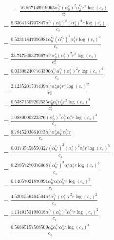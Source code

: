 \documentclass[10pt]{article}
\begin{document}
\begin{align*}
\phantom{R_{0,8}} &\phantom{={}}{}  - \frac{16.567149919063 \alpha_{0}^{c_s} \left(\alpha_{0}^s\right)^{2} \alpha_{2}^{c_s} r^{2} \log{\left(c_{s} \right)}}{c_{s}^{2}} \\
&{}  - \frac{8.3364134707847 \alpha_{0}^{c_s} \left(\alpha_{0}^s\right)^{2} \left(\alpha_{1}^s\right)^{2} r \log{\left(c_{s} \right)}}{c_{s}} \\
&{}  - \frac{0.52311847096981 \alpha_{0}^{c_s} \left(\alpha_{1}^{c_s}\right)^{2} \alpha_{1}^s r \log{\left(c_{s} \right)}^{2}}{c_{s}} \\
&{}  - \frac{33.747569327667 \alpha_{0}^{c_s} \alpha_{0}^s \left(\alpha_{1}^s\right)^{2} r^{2} \log{\left(c_{s} \right)}}{c_{s}^{2}} \\
&{}  - \frac{0.033082407763396 \alpha_{0}^{c_s} \alpha_{1}^{c_s} \left(\alpha_{1}^s\right)^{2} r \log{\left(c_{s} \right)}^{4}}{c_{s}} \\
&{}  - \frac{2.1235201537439 \alpha_{0}^{c_s} \alpha_{0}^s \alpha_{1}^s r^{4} \log{\left(c_{s} \right)}^{2}}{c_{s}^{4}} \\
&{}  - \frac{0.53871509262535 \alpha_{0}^s \alpha_{1}^s \alpha_{2}^s r^{2} \log{\left(c_{s} \right)}^{4}}{c_{s}^{2}} \\
&{}  - \frac{1.0880000223376 \left(\alpha_{0}^s\right)^{3} \alpha_{1}^{c_s} \alpha_{1}^s r \log{\left(c_{s} \right)}^{3}}{c_{s}} \\
&{}  - \frac{8.7845203661073 \alpha_{0}^{c_s} \alpha_{0}^s \alpha_{1}^{c_s} \alpha_{2}^{c_s} r}{c_{s}} \\
&{}  - \frac{0.01735458550327 \left(\alpha_{0}^{c_s}\right)^{2} \left(\alpha_{0}^s\right)^{2} \alpha_{2}^s r \log{\left(c_{s} \right)}^{5}}{c_{s}} \\
&{}  - \frac{0.27857270376068 \left(\alpha_{0}^{c_s}\right)^{3} \alpha_{0}^s \alpha_{2}^s r \log{\left(c_{s} \right)}^{3}}{c_{s}} \\
&{}  - \frac{0.14057021870991 \alpha_{0}^{c_s} \alpha_{1}^s \alpha_{3}^{c_s} r \log{\left(c_{s} \right)}^{2}}{c_{s}} \\
&{}  - \frac{4.5201556464504 \alpha_{0}^s \alpha_{1}^{c_s} \left(\alpha_{1}^s\right)^{2} r \log{\left(c_{s} \right)}^{2}}{c_{s}} \\
&{}  - \frac{1.1340153198018 \alpha_{0}^{c_s} \left(\alpha_{0}^s\right)^{4} \alpha_{1}^{c_s} r \log{\left(c_{s} \right)}^{2}}{c_{s}} \\
&{}  - \frac{0.56865157508509 \alpha_{0}^s \alpha_{1}^{c_s} \alpha_{3}^s r \log{\left(c_{s} \right)}^{3}}{c_{s}} \\

\end{align*}
\end{document}
